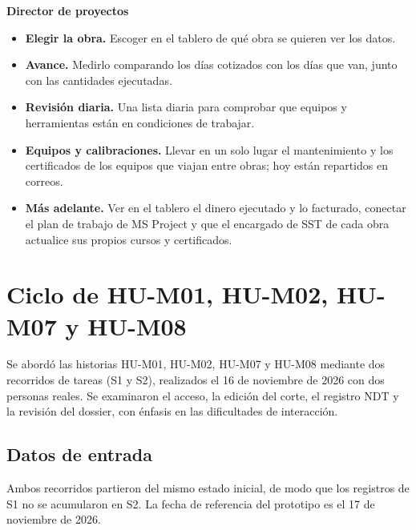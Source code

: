 \documentclass[11pt]{article}
\begin{document}
\textbf{Director de proyectos}
\begin{itemize}
  \item \textbf{Elegir la obra.} Escoger en el tablero de qué obra se quieren ver los datos.
  \item \textbf{Avance.} Medirlo comparando los días cotizados con los días que van, junto con las cantidades ejecutadas.
  \item \textbf{Revisión diaria.} Una lista diaria para comprobar que equipos y herramientas están en condiciones de trabajar.
  \item \textbf{Equipos y calibraciones.} Llevar en un solo lugar el mantenimiento y los certificados de los equipos que viajan entre obras; hoy están repartidos en correos.
  \item \textbf{Más adelante.} Ver en el tablero el dinero ejecutado y lo facturado, conectar el plan de trabajo de MS Project y que el encargado de SST de cada obra actualice sus propios cursos y certificados.
\end{itemize}

\section{Ciclo de HU-M01, HU-M02, HU-M07 y HU-M08}\label{sec:ciclo2}

Se abordó las historias HU-M01, HU-M02, HU-M07 y HU-M08 mediante dos recorridos de tareas (S1 y S2), realizados el 16 de noviembre de 2026 con dos personas reales. Se examinaron el acceso, la edición del corte, el registro NDT y la revisión del dossier, con énfasis en las dificultades de interacción.

\subsection*{Datos de entrada}

Ambos recorridos partieron del mismo estado inicial, de modo que los registros de S1 no se acumularon en S2. La fecha de referencia del prototipo es el 17 de noviembre de 2026.
\end{document}
